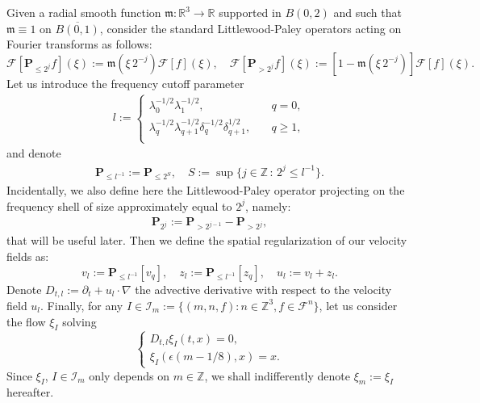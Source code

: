 \documentclass[10pt,a4paper]{amsart}
\numberwithin{equation}{section}
\numberwithin{corollario}{section}
\numberwithin{lemma}{section}
\numberwithin{prop}{section}
\theoremstyle{definition}
\theoremstyle{remark}
\newcommand{\Z}{\mathbb{Z}}
\newcommand{\R}{\mathbb{R}}
\newcommand{\F}{\mathcal{F}}
\newcommand{\I}{\mathcal{I}}
\renewcommand{\P}{\mathbf{P}}
\newcommand{\qq}{_{q+1}}
\begin{document}
Given a radial smooth function  $\mathfrak{m}:\R^3 \to \R$ supported in $B(0,2)$ and such that $\mathfrak{m} \equiv 1$ on $\overline{B(0,1)}$, consider the standard Littlewood-Paley operators acting on Fourier transforms as follows:
\begin{equation}
    \mathscr{F}[\P_{\le 2^j}f](\xi)
    :=
    \mathfrak{m}(\xi\,2^{-j})\F[f](\xi),
    \quad 
    \mathscr{F}[\P_{> 2^j}f](\xi)
    :=
    [1-\mathfrak{m}(\xi\,2^{-j})]\mathscr{F}[f](\xi).
\end{equation}
Let us introduce the frequency cutoff parameter 
\begin{align}
    \label{eq:definition_l}
l:=\begin{cases}
    \lambda_0^{-1/2}\lambda_1^{-1/2},\,&q=0,\\
\lambda_q^{-1/2}\lambda\qq^{-1/2} \delta_q^{-1/2}\delta\qq^{1/2},\quad&q\geq 1,\\
\end{cases}
\end{align}
and denote
\begin{align}
    \P_{\le l^{-1}}:=\P_{\le 2^S},
    \quad
    S:=\sup \{ j \in \Z \,:\, 2^j\le l^{-1}\}.
\end{align}
Incidentally, we also define here the Littlewood-Paley operator projecting on the frequency shell of size approximately equal to $2^j$, namely: 
\begin{align}
    \P_{2^j}:=\P_{>2^{j-1}}-\P_{>2^{j}},
\end{align}
that will be useful later.
Then we define the spatial regularization of our velocity fields as:
\begin{equation}\label{e:u_l}
    v_l:=\P_{\le l^{-1}}[v_q],\quad z_l:= \P_{\le l^{-1}}[z_q],\quad u_l:=v_l+z_l.
\end{equation}
Denote $D_{t,l} := \partial_t + u_l \cdot \nabla$ the advective derivative with respect to the velocity field $u_l$.
Finally, for any $I\in\I_m:=\{(m,n,f):n\in\Z^3,f\in\F^n\}$, let us consider the flow $\xi_I$ solving 
\begin{equation}\label{e:flow}
    \begin{cases}
        D_{t,l} \xi_I(t,x)=0,\\
        \xi_I(\epsilon(m-1/8),x)=x.
    \end{cases}
\end{equation}
Since $\xi_I$, $I \in \mathcal{I}_m$ only depends on $m \in \Z$, we shall indifferently denote $\xi_m := \xi_I$ hereafter.
\end{document}
